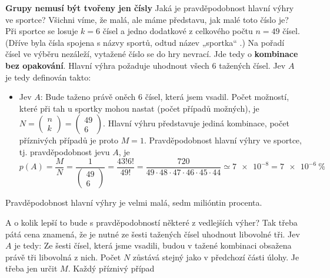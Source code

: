 \wikitextrule
\begin{example}\label{mai:exam052}
  \textbf{Grupy nemusí být tvořeny jen čísly}\newline\small
  Jaká je pravděpodobnost hlavní výhry ve sportce? Všichni víme, že malá, ale máme představu, jak malé
  toto číslo je? Při sportce se losuje \(k = 6\) čísel a jedno dodatkové z celkového počtu \(n = 49\) 
  čísel. (Dříve byla čísla spojena s názvy sportů, odtud název „sportka“ .) Na pořadí čísel ve výběru 
  nezáleží, vytažené číslo se do hry nevrací. Jde tedy o \textbf{kombinace bez opakování}. Hlavní výhra 
  požaduje uhodnout všech \num{6} tažených čísel. Jev \(A\) je tedy definován takto:
  
  \begin{itemize}
  \item Jev \(A\): Bude taženo právě oněch \num{6} čísel, která jsem vsadil.
        Počet možností, které při tah u sportky mohou nastat (počet případů možných), je \(N = 
        \begin{pmatrix} n \\ k\end{pmatrix} =  \begin{pmatrix} 49 \\ 6 \end{pmatrix} \). Hlavní výhru 
        představuje jediná kombinace, počet příznivých případů je proto \(M = 1\). Pravděpodobnost hlavní 
        výhry ve sportce, tj. pravděpodobnost jevu \(A\), je
        \begin{equation*}
          p(A) = \dfrac{M}{N} = \dfrac{1}{\begin{pmatrix} 49 \\ 6 \end{pmatrix}} 
               = \dfrac{43!6!}{49!} = \dfrac{720}{49\cdot48\cdot47\cdot46\cdot45\cdot44} \simeq \num{7e-8}
               = \SI{7e-6}{\percent}
        \end{equation*}
      \end{itemize}
      Pravděpodobnost hlavní výhry je velmi malá, sedm milióntin procenta. 
  \item A o kolik lepší to bude s pravděpodobností některé z vedlejších výher? Tak třeba pátá cena znamená, 
        že je nutné ze šesti tažených čísel uhodnout libovolné tři. Jev \(A\) je tedy: Ze šesti čísel, 
        která jsme vsadili, budou v tažené kombinaci obsažena právě tři libovolná z nich. Počet \(N\) 
        zůstává stejný jako v předchozí části úlohy. Je třeba jen určit \(M\). Každý příznivý případ     

\end{example}
